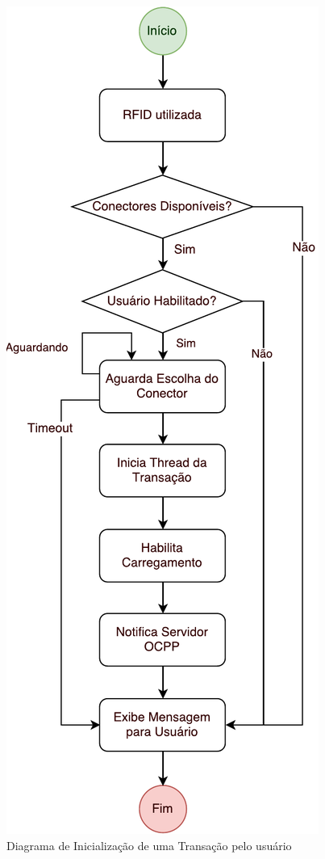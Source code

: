       \begin{figure}[H]
        \begin{center}
          \includegraphics[height=\textheight]{assets/pdfs/sw-starttransaction.pdf}
          \caption{Diagrama de Inicialização de uma Transação pelo usuário}
          \label{fig:sw-starttransaction}
        \end{center}
      \end{figure}

